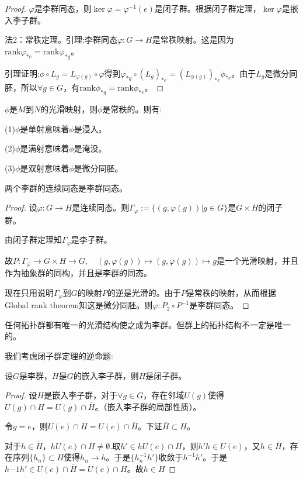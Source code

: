 \begin{proof}
$\varphi$是李群同态，则$\ker \varphi=\varphi^{-1}(e)$是闭子群。根据闭子群定理，$\ker \varphi$是嵌入李子群。

法2：常秩定理。引理:李群同态$\varphi: G \to H$是常秩映射。这是因为$\mathrm{rank}\varphi_{*e}=\mathrm{rank}\varphi_{*g}$。

引理证明:$\phi \circ L_g=L_{\varphi(g)}\circ \varphi$得到$\varphi_{*g}\circ(L_g)_{*e}=(L_{\phi(g)})_{*e}\phi_{*e}$。由于$L_g$是微分同胚，所以$\forall g \in G$，有$\mathrm{rank}\phi_{*g}=\mathrm{rank}\phi_{*e}$。

\end{proof}
\begin{theorem}
    $\phi$是$M$到$N$的光滑映射，则$\phi$是常秩的。则有:

    (1)$\phi$是单射意味着$\phi$是浸入。

    (2)$\phi$是满射意味着$\phi$是淹没。

    (3)$\phi$是双射意味着$\phi$是微分同胚。
\end{theorem}
\begin{theorem}
    两个李群的连续同态是李群同态。
\end{theorem}
\begin{proof}
    设$\varphi:G \to H$是连续同态。则$\Gamma_\varphi:=\{(g,\varphi(g))|g \in G\}$是$G \times H$的闭子群。

    由闭子群定理知$\Gamma_\varphi$是李子群。

    故$P:\Gamma_\varphi \to G \times H \to G, \quad (g,\varphi(g)) \mapsto (g,\varphi(g))\mapsto g$是一个光滑映射，并且作为抽象群的同构，并且是李群的同态。

    现在只用说明$\Gamma_\varphi$到$G$的映射$P$的逆是光滑的。由于$P$是常秩的映射，从而根据Global rank theorem知这是微分同胚。则$\varphi:P_2 \circ P^{-1}$是李群同态。
\end{proof}
\begin{proposition}
    任何拓扑群都有唯一的光滑结构使之成为李群。但群上的拓扑结构不一定是唯一的。
\end{proposition}
我们考虑闭子群定理的逆命题:
\begin{proposition}
    设$G$是李群，$H$是$G$的嵌入李子群，则$H$是闭子群。
\end{proposition}
\begin{proof}
设$H$是嵌入李子群，对于$\forall g \in G$，存在邻域$U(g)$使得$U(g) \cap H=U(g)\cap \overline{H}$。（嵌入李子群的局部性质）。

令$g=e$，则$U(e)\cap H=U(e)\cap \overline{H}$。下证$\overline{H}\subset H$。

对于$ h\in \overline{H}$，$hU(e)\cap H \neq \emptyset$.取$h'\in hU(e)\cap H$，则$h'h \in U(e)$，又$h \in \overline{H}$，存在序列$\{h_n\} \subset H$使得$h_n \to h$。于是$\{h_n^{-1}h'\}$收敛于$h^{-1}h'$。于是$h{-1}h' \in U(e)\cap \overline{H}=U(e)\cap H$。故$h \in H$
\end{proof}
